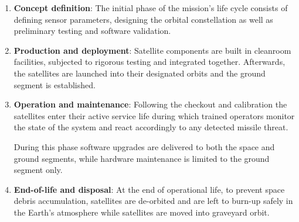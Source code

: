 \begin{enumerate}
    \item \textbf{Concept definition}: The initial phase of the mission's life cycle consists of defining sensor parameters, designing the orbital constellation as well as preliminary testing and software validation. 

    \item \textbf{Production and deployment}: Satellite components are built in cleanroom facilities, subjected to rigorous testing and integrated together. Afterwards, the satellites are launched into their designated orbits and the ground segment is established. 

    \item \textbf{Operation and maintenance}: Following the checkout and calibration the satellites enter their active service life during which trained operators monitor the state of the system and react accordingly to any detected missile threat.  
    
    During this phase software upgrades are delivered to both the space and ground segments, while hardware maintenance is limited to the ground segment only. 

    \item \textbf{End-of-life and disposal}: At the end of operational life, to prevent space debris accumulation,  satellites are de-orbited and are left to burn-up safely in the Earth's atmosphere while  satellites are moved into graveyard orbit. 
\end{enumerate}
